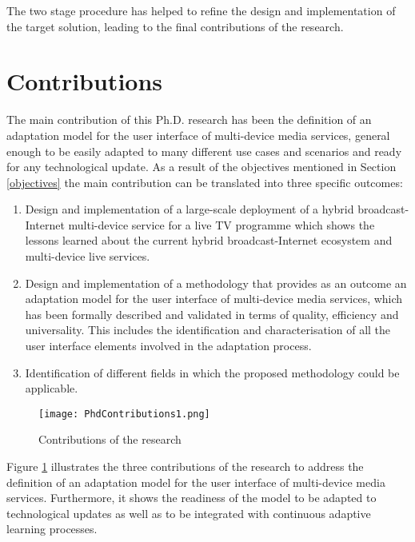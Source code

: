 The two stage procedure has helped to refine the design and implementation of the target solution, leading to the final contributions of the research.



\section{Contributions}\label{contributions}
The main contribution of this Ph.D. research has been the definition of an adaptation model for the user interface of multi-device media services, general enough to be easily adapted to many different use cases and scenarios and ready for any technological update. As a result of the objectives mentioned in Section \ref{objectives} the main contribution can be translated into three specific outcomes: 
\begin{enumerate}
	\item Design and implementation of a large-scale deployment of a hybrid broadcast-Internet multi-device service for a live TV programme which shows the lessons learned about the current hybrid broadcast-Internet ecosystem and multi-device live services. \label{contribution:1}
	\item Design and implementation of a methodology that provides as an outcome an adaptation model for the user interface of multi-device media services, which has been formally described and validated in terms of quality, efficiency and universality. This includes the identification and characterisation of all the user interface elements involved in the adaptation process. \label{contribution:2}
	\item Identification of different fields in which the proposed methodology could be applicable.\label{contribution:3}
	
\end{enumerate}

\begin{figure}
	\centering
	\texttt{[image: PhdContributions1.png]}
	\caption[Contributions of the research]{Contributions of the research}
	\label{fig:PhdContributions}
\end{figure}

Figure \ref{fig:PhdContributions} illustrates the three contributions of the research to address the definition of an adaptation model for the user interface of multi-device media services. Furthermore, it shows the readiness of the model to be adapted to technological updates as well as to be integrated with continuous adaptive learning processes. 

